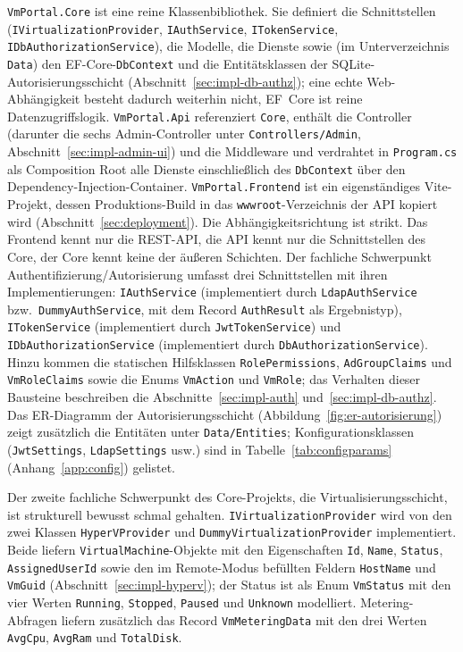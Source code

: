 \documentclass[12pt,a4paper]{article}
\begin{document}
\texttt{VmPortal.Core} ist eine reine Klassenbibliothek. Sie definiert die Schnittstellen (\texttt{IVirtualizationProvider}, \texttt{IAuthService}, \texttt{ITokenService}, \texttt{IDbAuthorizationService}), die Modelle, die Dienste sowie (im Unterverzeichnis \texttt{Data}) den EF-Core-\texttt{DbContext} und die Entitätsklassen der SQLite-Autorisierungsschicht (Abschnitt~\ref{sec:impl-db-authz}); eine echte Web-Abhängigkeit besteht dadurch weiterhin nicht, EF~Core ist reine Datenzugriffslogik. \texttt{VmPortal.Api} referenziert \texttt{Core}, enthält die Controller (darunter die sechs Admin-Controller unter \texttt{Controllers/Admin}, Abschnitt~\ref{sec:impl-admin-ui}) und die Middleware und verdrahtet in \texttt{Program.cs} als Composition Root alle Dienste einschließlich des \texttt{DbContext} über den Dependency-Injection-Container. \texttt{VmPortal.Frontend} ist ein eigenständiges Vite-Projekt, dessen Produktions-Build in das \texttt{wwwroot}-Verzeichnis der API kopiert wird (Abschnitt~\ref{sec:deployment}). Die Abhängigkeitsrichtung ist strikt. Das Frontend kennt nur die REST-API, die API kennt nur die Schnittstellen des Core, der Core kennt keine der äußeren Schichten. Der fachliche Schwerpunkt Authentifizierung/Autorisierung umfasst drei Schnittstellen mit ihren Implementierungen: \texttt{IAuthService} (implementiert durch \texttt{LdapAuthService} bzw.\ \texttt{DummyAuthService}, mit dem Record \texttt{AuthResult} als Ergebnistyp), \texttt{ITokenService} (implementiert durch \texttt{JwtTokenService}) und \texttt{IDbAuthorizationService} (implementiert durch \texttt{DbAuthorizationService}). Hinzu kommen die statischen Hilfsklassen \texttt{RolePermissions}, \texttt{AdGroupClaims} und \texttt{VmRoleClaims} sowie die Enums \texttt{VmAction} und \texttt{VmRole}; das Verhalten dieser Bausteine beschreiben die Abschnitte~\ref{sec:impl-auth} und~\ref{sec:impl-db-authz}. Das ER-Diagramm der Autorisierungsschicht (Abbildung~\ref{fig:er-autorisierung}) zeigt zusätzlich die Entitäten unter \texttt{Data/Entities}; Konfigurationsklassen (\texttt{JwtSettings}, \texttt{LdapSettings} usw.) sind in Tabelle~\ref{tab:configparams} (Anhang~\ref{app:config}) gelistet.

Der zweite fachliche Schwerpunkt des Core-Projekts, die Virtualisierungsschicht, ist strukturell bewusst schmal gehalten. \texttt{IVirtualizationProvider} wird von den zwei Klassen \texttt{HyperVProvider} und \texttt{DummyVirtualizationProvider} implementiert. Beide liefern \texttt{VirtualMachine}-Objekte mit den Eigenschaften \texttt{Id}, \texttt{Name}, \texttt{Status}, \texttt{AssignedUserId} sowie den im Remote-Modus befüllten Feldern \texttt{HostName} und \texttt{VmGuid} (Abschnitt~\ref{sec:impl-hyperv}); der Status ist als Enum \texttt{VmStatus} mit den vier Werten \texttt{Running}, \texttt{Stopped}, \texttt{Paused} und \texttt{Unknown} modelliert. Metering-Abfragen liefern zusätzlich das Record \texttt{VmMeteringData} mit den drei Werten \texttt{AvgCpu}, \texttt{AvgRam} und \texttt{TotalDisk}.
\end{document}
